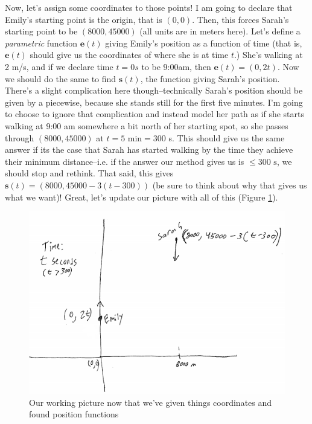 \documentclass[english]{article}
\renewcommand\vec{\mathbf}
\newcommand{\st}{\text{ s}}
\theoremstyle{remark}
\theoremstyle{definition}
\begin{document}
 Now, let's assign some coordinates to those points! I am going to declare that Emily's starting point is the origin, that is $(0,0)$. Then, this forces Sarah's starting point to be $(8000,45000)$ (all units are in meters here). Let's define a \emph{parametric} function $\vec{e}(t)$ giving Emily's position as a function of time (that is, $\vec{e}(t)$ should give us the coordinates of where she is at time $t$.) She's walking at 2 m/s, and if we declare time $t=0s$ to be 9:00am, then $\vec{e}(t)=(0,2t)$. Now we should do the same to find $\vec{s}(t)$, the function giving Sarah's position. There's a slight complication here though--technically Sarah's position should be given by a piecewise, because she stands still for the first five minutes. I'm going to choose to ignore that complication and instead model her path as if she starts walking at 9:00 am somewhere a bit north of her starting spot, so she passes through $(8000,45000)$ at $t=5$ min$=300$ s. This should give us the same answer if its the case that Sarah has started walking by the time they achieve their minimum distance--i.e. if the answer our method gives us is $\leq 300\st$, we should stop and rethink. That said, this gives $\vec{s}(t)=(8000, 45000-3(t-300))$ (be sure to think about why that gives us what we want)! Great, let's update our picture with all of this (Figure \ref{axes}).
 \begin{figure}[h!]\begin{centering}
 	\includegraphics[scale=.7]{fig2}\caption{Our working picture now that we've given things coordinates and found position functions}\label{axes}
 \end{centering}\end{figure}
\end{document}
